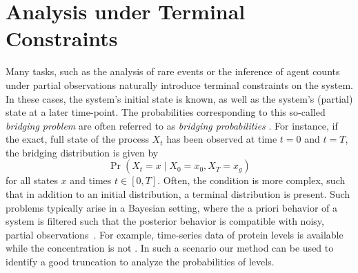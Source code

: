 \chapter{Analysis under Terminal Constraints}\label{ch:bridging}
Many tasks, such as the analysis of rare events or the inference of agent counts under partial observations naturally introduce terminal constraints on the system.
In these cases, the system's initial state is known, as well as the system's (partial) state at a later time-point.
The probabilities corresponding to this so-called \emph{bridging problem} are often referred to as \emph{bridging probabilities} \parencite{golightly2019efficient,golightly2011bayesian}.
For instance, if the exact, full state of the process $X_t$ has been observed at time $t=0$ and $t=T$, the bridging distribution is given by
\[
\Pr(X_t=x\mid X_{0}=x_{0},X_{T}=x_g)
\]
for all states $x$ and times $t\in [0,T]$.
Often, the condition is more complex, such that in addition to an initial distribution, a terminal distribution is present.
Such problems typically arise in a Bayesian setting, where the a priori behavior of a system is filtered such that the posterior behavior is compatible with noisy, partial observations~\parencite{broemeling2017bayesian,huang2016reconstructing}.
For example, time-series data of protein levels is available while the  concentration is not  \parencite{adan2017flow,huang2016reconstructing}.
In such a scenario our method can be used to identify a good truncation to analyze the probabilities of  levels.

